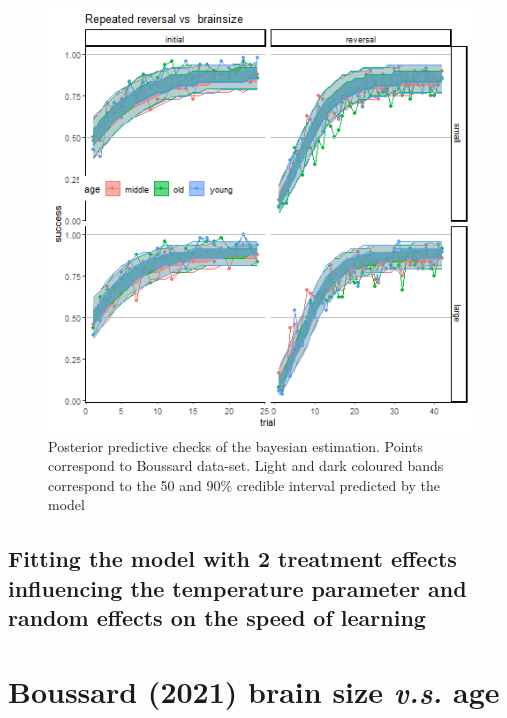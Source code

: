 \documentclass[
]{article}
\begin{document}
\begin{figure}

\includegraphics[width=6.67in,]{images/boussard2_ppchecks_tau} \hfill{}

\caption{Posterior predictive checks of the bayesian estimation. Points correspond to Boussard data-set. Light and dark coloured bands correspond to the 50 and 90\% credible interval predicted by the model}\label{fig:unnamed-chunk-15}
\end{figure}

\hypertarget{fitting-the-model-with-2-treatment-effects-influencing-the-temperature-parameter-and-random-effects-on-the-speed-of-learning}{%
\subsection{Fitting the model with 2 treatment effects influencing the
temperature parameter and random effects on the speed of
learning}\label{fitting-the-model-with-2-treatment-effects-influencing-the-temperature-parameter-and-random-effects-on-the-speed-of-learning}}

\hypertarget{boussard--boussard_link_2021-brain-size-v.s.-age-2}{%
\section{\texorpdfstring{Boussard (2021) brain size \emph{v.s.}
age}{Boussard (2021) brain size v.s. age}}\label{boussard--boussard_link_2021-brain-size-v.s.-age-2}}
\end{document}
